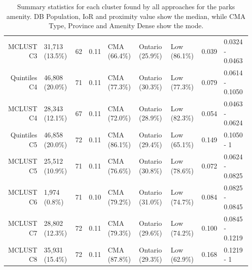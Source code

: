 \documentclass[11pt, a4paper]{article}
\begin{document}
\begin{table}[H]
{\begin{tabular}{|r|llllllll|}
  MCLUST C3 & 31,713 (13.5\%) & 62 & 0.11 & CMA (66.4\%) & Ontario (25.9\%) & Low (86.1\%) & 0.039 & 0.0324 - 0.0463 \\ 
  Quintiles C4 & 46,808 (20.0\%) & 71 & 0.11 & CMA (77.3\%) & Ontario (30.3\%) & Low (77.3\%) & 0.079 & 0.0614 - 0.1050 \\ 
  MCLUST C4 & 28,343 (12.1\%) & 67 & 0.11 & CMA (72.0\%) & Ontario (28.9\%) & Low (82.3\%) & 0.054 & 0.0463 - 0.0624 \\ 
  Quintiles C5 & 46,858 (20.0\%) & 72 & 0.11 & CMA (86.1\%) & Ontario (29.4\%) & Low (65.1\%) & 0.149 & 0.1050 - 1 \\ 
  MCLUST C5 & 25,512 (10.9\%) & 71 & 0.11 & CMA (76.6\%) & Ontario (30.8\%) & Low (78.6\%) & 0.072 & 0.0624 - 0.0825 \\ 
  MCLUST C6 & 1,974 (0.8\%) & 71 & 0.10 & CMA (79.2\%) & Ontario (31.0\%) & Low (74.7\%) & 0.084 & 0.0825 - 0.0845 \\ 
  MCLUST C7 & 28,802 (12.3\%) & 72 & 0.11 & CMA (79.3\%) & Ontario (29.6\%) & Low (74.2\%) & 0.100 & 0.0845 - 0.1219 \\ 
  MCLUST C8 & 35,931 (15.4\%) & 72 & 0.11 & CMA (87.8\%) & Ontario (29.3\%) & Low (62.9\%) & 0.168 & 0.1219 - 1 \\ 
   \hline
\end{tabular}
}
\caption[Parks cluster profiles]{Summary statistics for each cluster found by all approaches for the parks amenity. DB Population, IoR and proximity value show the median, while CMA Type, Province and Amenity Dense show the mode.}\label{parksprofiles}
\end{table}
\end{document}
